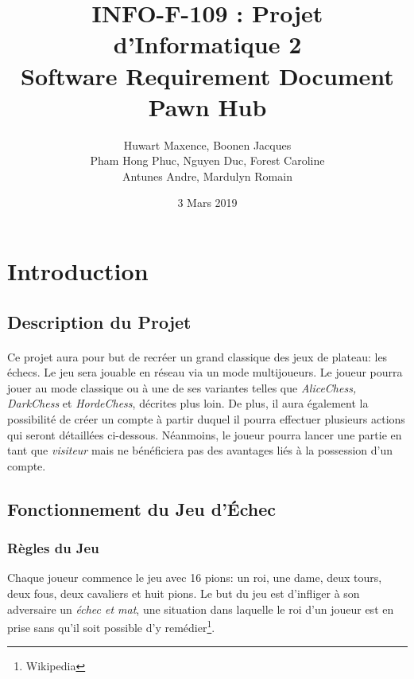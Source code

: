 \documentclass[10pt, a4paper]{article}
\title{\LARGE{INFO-F-109 : Projet d'Informatique 2 }\\
       \textbf{Software Requirement Document\\
	   Pawn Hub}}
\author{Huwart Maxence, Boonen Jacques\\
		Pham Hong Phuc, Nguyen Duc, Forest Caroline\\
		Antunes Andre, Mardulyn Romain}
\date{3 Mars 2019}
\begin{document}
	\maketitle
	\newpage
	\renewcommand{\contentsname}{Table des Matières}
	\tableofcontents %
	\newpage
	\section{Introduction}
		\subsection{Description du Projet}
			\paragraph{}Ce projet aura pour but de recréer un grand classique des jeux de plateau: les échecs. Le jeu sera jouable en réseau via un mode multijoueurs. Le joueur pourra jouer au mode classique ou à une de ses variantes telles que  {\itshape AliceChess, DarkChess} et {\itshape HordeChess}, décrites plus loin. De plus, il aura également la possibilité de créer un compte à partir duquel il pourra effectuer plusieurs actions qui seront détaillées ci-dessous. Néanmoins, le joueur pourra lancer une partie en tant que {\itshape visiteur} mais ne bénéficiera pas des avantages liés à la possession d'un compte.\\
			\subsection{Fonctionnement du Jeu d'Échec}
			\subsubsection{Règles du Jeu}
			Chaque joueur commence le jeu avec 16 pions: un roi, une dame, deux tours, deux fous, deux cavaliers et huit pions. Le but du jeu est d'infliger à son adversaire un \textit{échec et mat}, une situation dans laquelle le roi d'un joueur est en prise sans qu'il soit possible d'y remédier\footnote{Wikipedia}.
\end{document}
